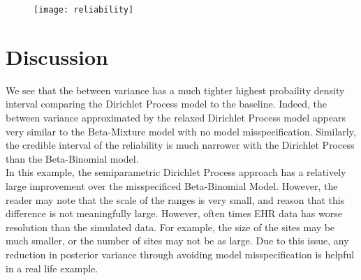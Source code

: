\documentclass{article}
\begin{document}
\begin{figure}
\texttt{[image: reliability]}
\end{figure}

\section{Discussion}

We see that the between variance has a much tighter highest probaility density interval comparing the Dirichlet Process model to the baseline. Indeed, the between variance approximated by the relaxed Dirichlet Process model appears very similar to the Beta-Mixture model with no model misspecification. Similarly, the credible interval of the reliability is much narrower with the Dirichlet Process than the Beta-Binomial model. \\

In this example, the semiparametric Dirichlet Process approach has a relatively large improvement over the misspecificed Beta-Binomial Model. However, the reader may note that the scale of the ranges is very small, and reason that this difference is not meaningfully large. However, often times EHR data has worse resolution than the simulated data. For example, the size of the sites may be much smaller, or the number of sites may not be as large. Due  to this issue, any reduction in posterior variance through avoiding model misspecification is helpful in a real life example.


\end{document}
